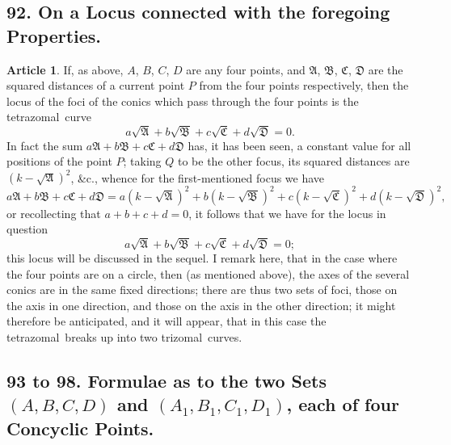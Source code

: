 \documentclass[11pt,a4paper]{article}
\theoremstyle{definition}
\newtheorem{art}{Article}
\newcommand{\trizomal}{trizomal}
\newcommand{\tetrazomal}{tetrazomal}
\begin{document}
\subsection*{92. On a Locus connected with the foregoing Properties.}

\begin{art}
If, as above, $A$, $B$, $C$, $D$ are any four points, and $\mathfrak{A}$, $\mathfrak{B}$, $\mathfrak{C}$, $\mathfrak{D}$ are the squared distances of a current point $P$ from the four points respectively, then the locus of the foci of the conics which pass through the four points is the \tetrazomal\ curve
\[
a\sqrt{\mathfrak{A}} + b\sqrt{\mathfrak{B}} + c\sqrt{\mathfrak{C}} + d\sqrt{\mathfrak{D}} = 0.
\]
In fact the sum $a\mathfrak{A} + b\mathfrak{B} + c\mathfrak{C} + d\mathfrak{D}$ has, it has been seen, a constant value for all positions of the point $P$; taking $Q$ to be the other focus, its squared distances are $(k - \sqrt{\mathfrak{A}})^{2}$, \&c., whence for the first-mentioned focus we have
\[
a\mathfrak{A} + b\mathfrak{B} + c\mathfrak{C} + d\mathfrak{D} = a(k - \sqrt{\mathfrak{A}})^{2} + b(k - \sqrt{\mathfrak{B}})^{2} + c(k - \sqrt{\mathfrak{C}})^{2} + d(k - \sqrt{\mathfrak{D}})^{2},
\]
or recollecting that $a + b + c + d = 0$, it follows that we have for the locus in question
\[
a\sqrt{\mathfrak{A}} + b\sqrt{\mathfrak{B}} + c\sqrt{\mathfrak{C}} + d\sqrt{\mathfrak{D}} = 0;
\]
this locus will be discussed in the sequel. I remark here, that in the case where the four points are on a circle, then (as mentioned above), the axes of the several conics are in the same fixed directions; there are thus two sets of foci, those on the axis in one direction, and those on the axis in the other direction; it might therefore be anticipated, and it will appear, that in this case the \tetrazomal\ breaks up into two \trizomal\ curves.
\end{art}

\subsection*{93 to 98. Formulae as to the two Sets $(A, B, C, D)$ and $(A_{1}, B_{1}, C_{1}, D_{1})$, each of four Concyclic Points.}
\end{document}
